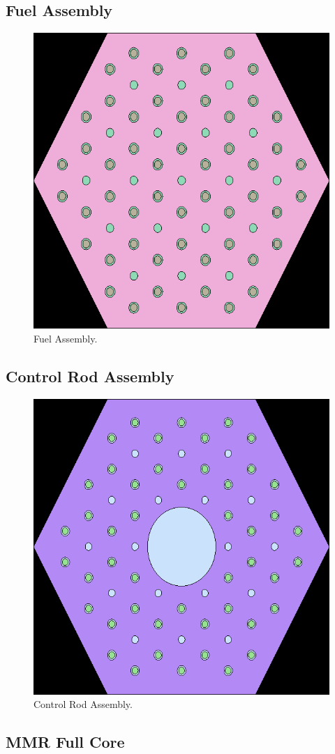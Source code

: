 \documentclass[11pt,letterpaper]{article}
\begin{document}
\subsection{Fuel Assembly}
\label{sub:FuelAssembly}

\begin{figure}[H]
	\centering
	\includegraphics[width=0.45\linewidth]{figures/fuel_block_geom1.png} 
	\hfill
	\caption{Fuel Assembly.}
	\label{fig:FuelAssembly}
\end{figure}

\subsection{Control Rod Assembly}
\label{sub:ControlRodAssembly}

\begin{figure}[H]
	\centering
	\includegraphics[width=0.45\linewidth]{figures/control_block_geom1.png} 
	\hfill
	\caption{Control Rod Assembly.}
	\label{fig:ControlRodAssembly}
\end{figure}

\subsection{MMR Full Core}
\label{sub:Full}



\pagebreak


\end{document}
